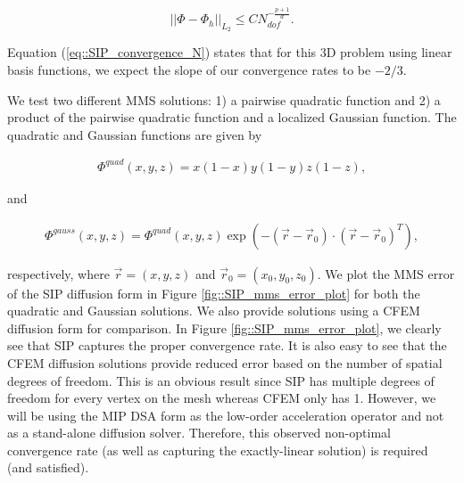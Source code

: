 \begin{equation}
\label{eq::SIP_convergence_N}
|| \Phi - \Phi_h ||_{L_2} \leq C N_{dof}^{-\frac{p+1}{d}}.
\end{equation}

\noindent Equation (\ref{eq::SIP_convergence_N}) states that for this 3D problem using linear basis functions, we expect the slope of our convergence rates to be $-2/3$.

We test two different MMS solutions: 1) a pairwise quadratic function and 2) a product of the pairwise quadratic function and a localized Gaussian function. The quadratic and Gaussian functions are given by 

\begin{equation}
\label{eq::SIP_quad_mms_solution}
\begin{aligned}
\Phi^{quad} (x,y,z) = x(1-x)y(1-y)z(1-z) ,
\end{aligned}
\end{equation}

\noindent and

\begin{equation}
\label{eq::SIP_gauss_mms_solution}
\begin{aligned}
\Phi^{gauss} (x,y,z) = \Phi^{quad} (x,y,z) \exp(- (\vec{r} - \vec{r}_0) \cdot (\vec{r} - \vec{r}_0)^{T}  ),
\end{aligned}
\end{equation}

\noindent respectively, where $\vec{r} = (x,y,z)$ and $\vec{r}_0 = (x_0,y_0,z_0)$. We plot the MMS error of the SIP diffusion form in Figure \ref{fig::SIP_mms_error_plot} for both the quadratic and Gaussian solutions. We also provide solutions using a CFEM diffusion form for comparison. In Figure \ref{fig::SIP_mms_error_plot}, we clearly see that SIP captures the proper convergence rate. It is also easy to see that the CFEM diffusion solutions provide reduced error based on the number of spatial degrees of freedom. This is an obvious result since SIP has multiple degrees of freedom for every vertex on the mesh whereas CFEM only has 1. However, we will be using the MIP DSA form as the low-order acceleration operator and not as a stand-alone diffusion solver. Therefore, this observed non-optimal convergence rate (as well as capturing the exactly-linear solution) is required (and satisfied).

